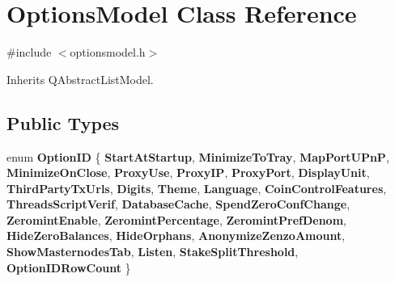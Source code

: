 \hypertarget{class_options_model}{}\section{Options\+Model Class Reference}
\label{class_options_model}


{\ttfamily \#include $<$optionsmodel.\+h$>$}



Inherits Q\+Abstract\+List\+Model.

\subsection*{Public Types}
\begin{DoxyCompactItemize}
\item 
\mbox{\label{class_options_model_a5c6c9ca8a01aca9f53e91f118e4878d2}} 
enum {\bfseries Option\+ID} \{ \newline
{\bfseries Start\+At\+Startup}, 
{\bfseries Minimize\+To\+Tray}, 
{\bfseries Map\+Port\+U\+PnP}, 
{\bfseries Minimize\+On\+Close}, 
\newline
{\bfseries Proxy\+Use}, 
{\bfseries Proxy\+IP}, 
{\bfseries Proxy\+Port}, 
{\bfseries Display\+Unit}, 
\newline
{\bfseries Third\+Party\+Tx\+Urls}, 
{\bfseries Digits}, 
{\bfseries Theme}, 
{\bfseries Language}, 
\newline
{\bfseries Coin\+Control\+Features}, 
{\bfseries Threads\+Script\+Verif}, 
{\bfseries Database\+Cache}, 
{\bfseries Spend\+Zero\+Conf\+Change}, 
\newline
{\bfseries Zeromint\+Enable}, 
{\bfseries Zeromint\+Percentage}, 
{\bfseries Zeromint\+Pref\+Denom}, 
{\bfseries Hide\+Zero\+Balances}, 
\newline
{\bfseries Hide\+Orphans}, 
{\bfseries Anonymize\+Zenzo\+Amount}, 
{\bfseries Show\+Masternodes\+Tab}, 
{\bfseries Listen}, 
\newline
{\bfseries Stake\+Split\+Threshold}, 
{\bfseries Option\+I\+D\+Row\+Count}
 \}
\end{DoxyCompactItemize}
